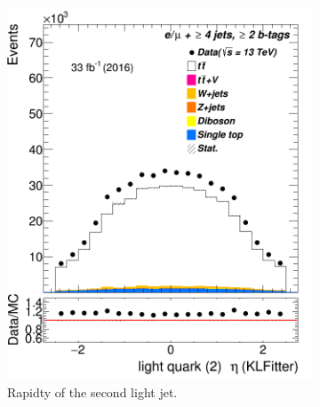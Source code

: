 \begin{figure} %
	\centering
	
	\begin{subfigure}{0.35\textwidth}
		\includegraphics[width=\linewidth]{ControlPlots_emujets_2016_4incl_2incl/klf_lq2_eta_emujets_2016.png}
		\caption{Rapidty of the second light jet.} \label{fig:klf12}
	\end{subfigure}
	\hspace*{1.5cm}	
	\begin{subfigure}{0.35\textwidth}

\end{subfigure}
\end{figure}
